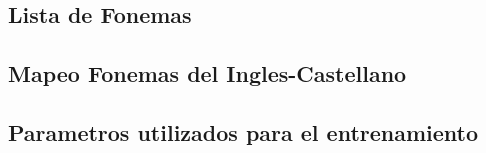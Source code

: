 \subsection{Lista de Fonemas}

\subsection{Mapeo Fonemas del Ingles-Castellano}

\subsection{Parametros utilizados para el entrenamiento}

